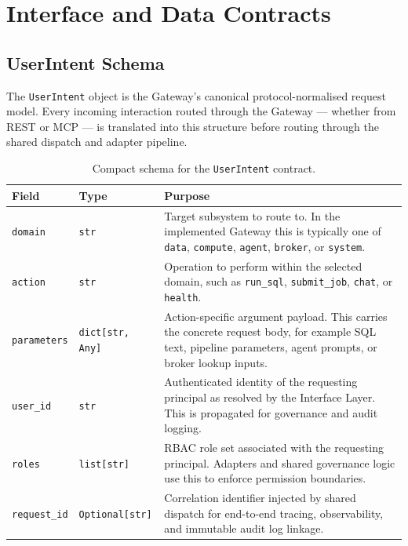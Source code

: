\documentclass[12pt, a4paper]{report}
\begin{document}
\chapter{Interface and Data Contracts}
\label{app:contracts}

\section{UserIntent Schema}
\label{app:userintent}

The \texttt{UserIntent} object is the Gateway's canonical protocol-normalised request
model. Every incoming interaction routed through the Gateway --- whether from REST or
MCP --- is translated into this structure before routing through the shared dispatch
and adapter pipeline.

\begin{table}[H]
  \centering
  \caption{Compact schema for the \texttt{UserIntent} contract.}
  \label{tab:userintent_schema}
  \begin{tabularx}{\textwidth}{l l X}
    \toprule
    \textbf{Field} & \textbf{Type} & \textbf{Purpose} \\
    \midrule
    \texttt{domain} & \texttt{str} & Target subsystem to route to. In the implemented Gateway this is typically one of \texttt{data}, \texttt{compute}, \texttt{agent}, \texttt{broker}, or \texttt{system}. \\
    \addlinespace
    \texttt{action} & \texttt{str} & Operation to perform within the selected domain, such as \texttt{run\_sql}, \texttt{submit\_job}, \texttt{chat}, or \texttt{health}. \\
    \addlinespace
    \texttt{parameters} & \texttt{dict[str, Any]} & Action-specific argument payload. This carries the concrete request body, for example SQL text, pipeline parameters, agent prompts, or broker lookup inputs. \\
    \addlinespace
    \texttt{user\_id} & \texttt{str} & Authenticated identity of the requesting principal as resolved by the Interface Layer. This is propagated for governance and audit logging. \\
    \addlinespace
    \texttt{roles} & \texttt{list[str]} & RBAC role set associated with the requesting principal. Adapters and shared governance logic use this to enforce permission boundaries. \\
    \addlinespace
    \texttt{request\_id} & \texttt{Optional[str]} & Correlation identifier injected by shared dispatch for end-to-end tracing, observability, and immutable audit log linkage. \\
    \bottomrule
  \end{tabularx}
\end{table}
\end{document}
